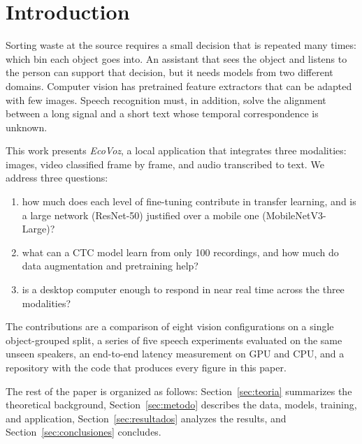 \section{Introduction}

Sorting waste at the source requires a small decision that is repeated many times: which bin each object goes into. An assistant that sees the object and listens to the person can support that decision, but it needs models from two different domains. Computer vision has pretrained feature extractors that can be adapted with few images. Speech recognition must, in addition, solve the alignment between a long signal and a short text whose temporal correspondence is unknown.

This work presents \emph{EcoVoz}, a local application that integrates three modalities: images, video classified frame by frame, and audio transcribed to text. We address three questions:
\begin{enumerate}
\item how much does each level of fine-tuning contribute in transfer learning, and is a large network (ResNet-50) justified over a mobile one (MobileNetV3-Large)?
\item what can a CTC model learn from only 100 recordings, and how much do data augmentation and pretraining help?
\item is a desktop computer enough to respond in near real time across the three modalities?
\end{enumerate}

The contributions are a comparison of eight vision configurations on a single object-grouped split, a series of five speech experiments evaluated on the same unseen speakers, an end-to-end latency measurement on GPU and CPU, and a repository with the code that produces every figure in this paper.

The rest of the paper is organized as follows: Section~\ref{sec:teoria} summarizes the theoretical background, Section~\ref{sec:metodo} describes the data, models, training, and application, Section~\ref{sec:resultados} analyzes the results, and Section~\ref{sec:conclusiones} concludes.
